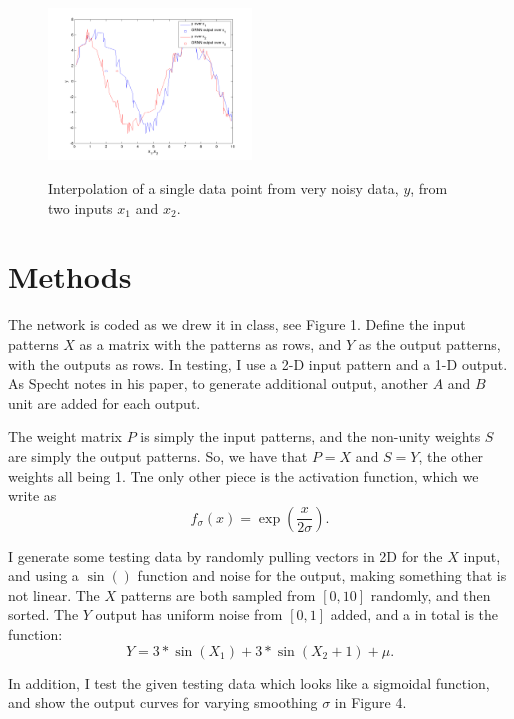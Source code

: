\documentclass[pre,twocolumn,twoside,byrevtex,superscriptaddress]{revtex4}
\begin{document}
\begin{figure}
 \centering
  \includegraphics[width=0.48\textwidth]{../figures/GRNN.png}
  \label{fig:1}
  \caption{Interpolation of a single data point from very noisy data, $y$, from two inputs $x_1$ and $x_2$.}
\end{figure}

\section{Methods}

The network is coded as we drew it in class, see Figure 1.
Define the input patterns $X$ as a matrix with the patterns as rows, and $Y$ as the output patterns, with the outputs as rows.
In testing, I use a 2-D input pattern and a 1-D output.
As Specht notes in his paper, to generate additional output, another $A$ and $B$ unit are added for each output.

The weight matrix $P$ is simply the input patterns, and the non-unity weights $S$ are simply the output patterns.
So, we have that $P = X$ and $S = Y$, the other weights all being 1.
Tne only other piece is the activation function, which we write as
\begin{equation} f_\sigma(x) = \exp \left( \frac{x}{2\sigma} \right). \end{equation}

I generate some testing data by randomly pulling vectors in 2D for the $X$ input, and using a $\sin()$ function and noise for the output, making something that is not linear.
The $X$ patterns are both sampled from $[0,10]$ randomly, and then sorted.
The $Y$ output has uniform noise from $[0,1]$ added, and a in total is the function:
\begin{equation} Y = 3*\sin(X_1) + 3*\sin(X_2+1) + \mu. \end{equation}

In addition, I test the given testing data which looks like a sigmoidal function, and show the output curves for varying smoothing $\sigma$ in Figure 4.
\end{document}
